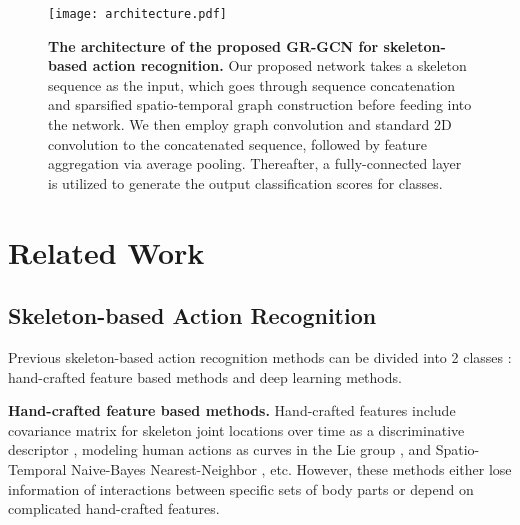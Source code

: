 \documentclass[conference]{IEEEtran}
\begin{document}
\begin{figure*}[t]
    \label{fig:framework}
    \centering
    \texttt{[image: architecture.pdf]}
    \caption{\textbf{The architecture of the proposed GR-GCN for skeleton-based action recognition.} Our proposed network takes a skeleton sequence as the input, which goes through sequence concatenation and sparsified spatio-temporal graph construction before feeding into the network. We then employ graph convolution and standard 2D convolution to the concatenated sequence, followed by feature aggregation via average pooling. Thereafter, a fully-connected layer is utilized to generate the output classification scores for  classes.}
    \label{fig:pipeline}
\end{figure*}

\section{Related Work}
\label{sec:related}

\subsection{Skeleton-based Action Recognition} 
Previous skeleton-based action recognition methods can be divided into 2 classes \cite{yan18}: hand-crafted feature based methods and deep learning methods. 

\textbf{Hand-crafted feature based methods.} Hand-crafted features include covariance matrix for skeleton joint locations over time as a discriminative descriptor \cite{hussein13}, modeling human actions as curves in the Lie group \cite{vemulapalli14}, and Spatio-Temporal Naive-Bayes Nearest-Neighbor \cite{Weng17cvpr}, etc. However, these methods either lose information of interactions between specific sets of body parts or depend on complicated hand-crafted features.
\end{document}
